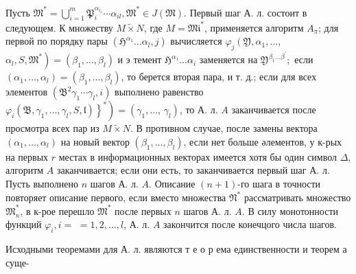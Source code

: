 \documentclass[10pt]{article}
\begin{document}
Пусть $\mathfrak{M}^{*}=\bigcup_{i=1}^{m} \mathfrak{P}_{i}^{\alpha_{i_{1}}} \cdots \alpha_{i l}, \mathfrak{M}^{*} \in J(\mathfrak{M})$. Первый шаг А. л. состоит в следующем. $К$ множеству $M \widetilde{\times} N$, где $M=\mathfrak{M i}^{*}$, применяется алгоритм $A_{\pi}$; для первой по порядку пары $\left(\mathfrak{H}^{\alpha_{1}} \ldots \alpha_{l}, j\right)$ вычисляется $\varphi_{j}\left(\mathfrak{Y}, \alpha_{1}, \ldots\right.$, $\left.\alpha_{l}, S, \mathfrak{M}^{*}\right)=\left(\beta_{1}, \ldots, \beta_{l}\right)$ и э темент $\mathfrak{H}^{\alpha_{1}} \ldots \alpha_{i}$ заменяется на $\mathfrak{Y}^{\beta_{1} \ldots \beta^{\prime}} ;$ если $\left(\alpha_{1}, \ldots, \alpha_{l}\right)=\left(\beta_{1}, \ldots, \beta_{l}\right)$, то берется вторая пара, и т. д.; если для всех элементов $\left(\mathfrak{B}^{2} \gamma_{1} \cdots \gamma_{l}, i\right)$ выполнено равенство $\left.\left.\varphi_{i}\left(\mathfrak{B}, \gamma_{1}, \ldots, \gamma_{l}, S, \mathfrak{l}\right)\right\}^{*}\right)=\left(\gamma_{1}, \ldots\right.$, $\left.\gamma_{l}\right)$, то А. л. $A$ заканчивается после просмотра всех пар из $M \widetilde{\times} N$. В противном случае, после замены вектора $\left(\alpha_{1}, \ldots, \alpha_{l}\right)$ на новый вектор $\left(\beta_{1}, \ldots, \beta_{l}\right)$, если нет больше әлементов, у к-рых на первых $r$ местах в информационных векторах имеется хотя бы один символ $\Delta$, алгоритм $A$ заканчивается; если они есть, то заканчивается первый шаг А. л. Пусть выполнено $n$ шагов А. л. $A$. Описание $(n+1)$-го шага в точности повторяет описание первого, если вместо множества $\mathfrak{N}^{*}$ рассматривать множество $\mathfrak{M}_{n}^{*}$, в к-рое перешло $\mathfrak{M}^{*}$ после первых $n$ шагов А. л. $A$. В силу монотонности функций $\varphi_{i}, i=$ $=1,2, \ldots, l$, А. л. $A$ закончится после конечцого числа шагов.



Исходными теоремами для А. л. являются т е о р ема единственности и теорем а суще-
\end{document}
